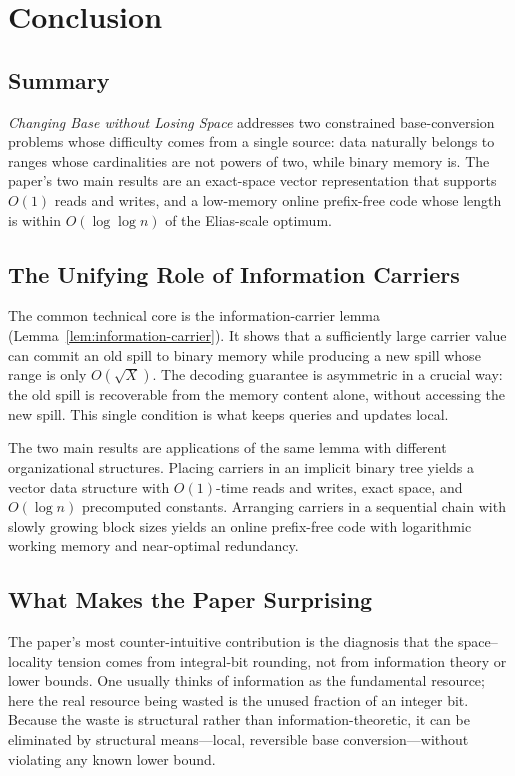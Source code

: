 \section{Conclusion}
\label{sec:conclusion}

\subsection{Summary}

\textit{Changing Base without Losing Space} addresses two constrained
base-conversion problems whose difficulty comes from a single source: data
naturally belongs to ranges whose cardinalities are not powers of two, while
binary memory is.  The paper's two main results are an exact-space vector
representation that supports $O(1)$ reads and writes, and a low-memory online
prefix-free code whose length is within $O(\log\log n)$ of the Elias-scale
optimum.

\subsection{The Unifying Role of Information Carriers}

The common technical core is the information-carrier lemma
(Lemma~\ref{lem:information-carrier}).  It shows that a sufficiently large
carrier value can commit an old spill to binary memory while producing a new
spill whose range is only $O(\sqrt{X})$.  The decoding guarantee is
asymmetric in a crucial way: the old spill is recoverable from the memory
content alone, without accessing the new spill.  This single condition is
what keeps queries and updates local.

The two main results are applications of the same lemma with different
organizational structures.  Placing carriers in an implicit binary tree
yields a vector data structure with $O(1)$-time reads and writes, exact
space, and $O(\log n)$ precomputed constants.  Arranging carriers in a
sequential chain with slowly growing block sizes yields an online prefix-free
code with logarithmic working memory and near-optimal redundancy.

\subsection{What Makes the Paper Surprising}

The paper's most counter-intuitive contribution is the diagnosis that the
space--locality tension comes from integral-bit rounding, not from
information theory or lower bounds.  One usually thinks of information as the
fundamental resource; here the real resource being wasted is the unused
fraction of an integer bit.  Because the waste is structural rather than
information-theoretic, it can be eliminated by structural means---local,
reversible base conversion---without violating any known lower bound.

